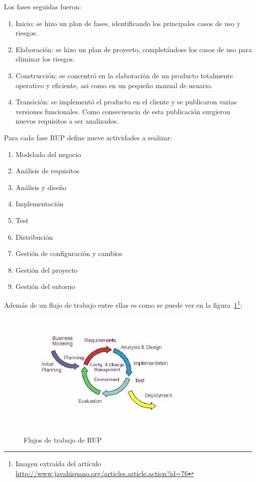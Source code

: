 Los fases seguidas fueron:

\begin{enumerate}
  \item Inicio: se hizo un plan de fases, identificando los principales 
	casos de uso y riesgos.
  \item Elaboración: se hizo un plan de proyecto, completándose los casos 
	de uso para eliminar los riesgos.
  \item Construcción: se concentró en la elaboración de un producto totalmente 
	operativo y eficiente, asi como en un pequeño manual de usuario.
  \item Transición: se implementó el producto en el cliente y se publicaron
	varias versiones funcionales. Como consecuencia de esta publicación
	surgieron nuevos requisitos a ser analizados.
\end{enumerate}

Para cada fase RUP define nueve actividades a realizar:

\begin{enumerate}
 \item Modelado del negocio
 \item Análisis de requisitos
 \item Análisis y diseño
 \item Implementación
 \item Test
 \item Distribución
 \item Gestión de configuración y cambios
 \item Gestión del proyecto
 \item Gestión del entorno
\end{enumerate}

Además de un flujo de trabajo entre ellas es como se puede ver en la 
figura~\ref{fig:RUPWorkflow}\footnote{Imagen extraída del artículo
\url{http://www.javahispano.org/articles.article.action?id=76}}:

\begin{figure}[ht]
	\centering
	\includegraphics[width=9cm]{images/workflow-rup.png}
	\caption{Flujos de trabajo de RUP}
	\label{fig:RUPWorkflow}
\end{figure}

